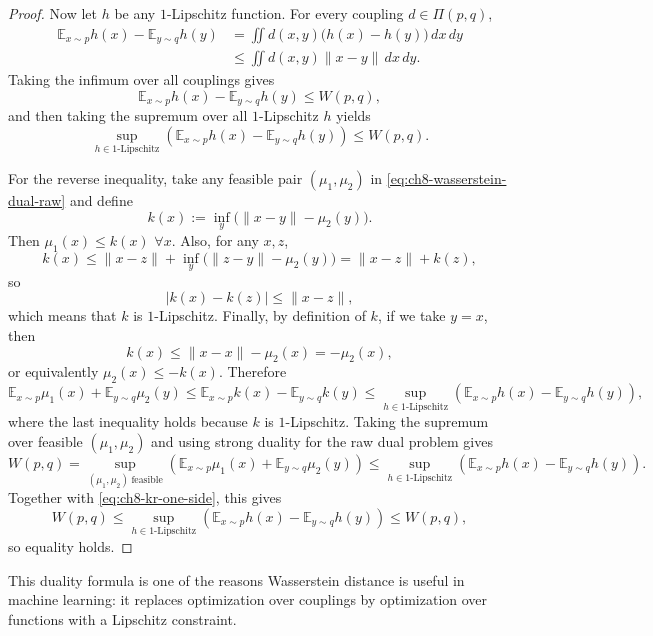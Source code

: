 \begin{proof}
Now let $h$ be any $1$-Lipschitz function. For every coupling $d\in \Pi(p,q)$,
\begin{align*}
  \mathbb{E}_{x\sim p} h(x) - \mathbb{E}_{y\sim q} h(y)
  &=
  \iint d(x,y)\bigl(h(x)-h(y)\bigr)\,dx\,dy \\
  &\le
  \iint d(x,y)\|x-y\|\,dx\,dy.
\end{align*}
Taking the infimum over all couplings gives
\[
  \mathbb{E}_{x\sim p} h(x) - \mathbb{E}_{y\sim q} h(y)
  \le W(p,q),
\]
and then taking the supremum over all $1$-Lipschitz $h$ yields
\begin{equation}
  \label{eq:ch8-kr-one-side}
  \sup_{h\in 1\text{-Lipschitz}}
  \left(
    \mathbb{E}_{x\sim p} h(x)
    -
    \mathbb{E}_{y\sim q} h(y)
  \right)
  \le W(p,q).
\end{equation}

For the reverse inequality, take any feasible pair $(\mu_1,\mu_2)$ in
\eqref{eq:ch8-wasserstein-dual-raw} and define
\[
  k(x)
  :=
  \inf_y \bigl(\|x-y\|-\mu_2(y)\bigr).
\]
Then \(\mu_1(x)\le k(x)\) \(\forall x\). Also, for any $x,z$,
\[
  k(x)
  \le
  \|x-z\|
  +
  \inf_y \bigl(\|z-y\|-\mu_2(y)\bigr)
  =
  \|x-z\| + k(z),
\]
so
\[
  |k(x)-k(z)|\le \|x-z\|,
\]
which means that $k$ is $1$-Lipschitz. Finally, by definition of $k$, if we
take $y=x$, then
\[
  k(x)\le \|x-x\|-\mu_2(x) = -\mu_2(x),
\]
or equivalently $\mu_2(x)\le -k(x)$. Therefore
\[
  \mathbb{E}_{x\sim p}\mu_1(x)
  +
  \mathbb{E}_{y\sim q}\mu_2(y)
  \le
  \mathbb{E}_{x\sim p}k(x)
  -
  \mathbb{E}_{y\sim q}k(y)
  \le
  \sup_{h\in 1\text{-Lipschitz}}
  \left(
    \mathbb{E}_{x\sim p} h(x)
    -
    \mathbb{E}_{y\sim q} h(y)
  \right),
\]
where the last inequality holds because $k$ is $1$-Lipschitz. Taking the
supremum over feasible $(\mu_1,\mu_2)$ and using strong duality for the raw
dual problem gives
\[
  W(p,q)
  =
  \sup_{(\mu_1,\mu_2)\ \text{feasible}}
  \left(
    \mathbb{E}_{x\sim p}\mu_1(x)
    +
    \mathbb{E}_{y\sim q}\mu_2(y)
  \right)
  \le
  \sup_{h\in 1\text{-Lipschitz}}
  \left(
    \mathbb{E}_{x\sim p} h(x)
    -
    \mathbb{E}_{y\sim q} h(y)
  \right).
\]
Together with \eqref{eq:ch8-kr-one-side}, this gives
\[
  W(p,q)
  \le
  \sup_{h\in 1\text{-Lipschitz}}
  \left(
    \mathbb{E}_{x\sim p} h(x)
    -
    \mathbb{E}_{y\sim q} h(y)
  \right)
  \le
  W(p,q),
\]
so equality holds.
\end{proof}

This duality formula is one of the reasons Wasserstein distance is useful in
machine learning: it replaces optimization over couplings by optimization over
functions with a Lipschitz constraint.

